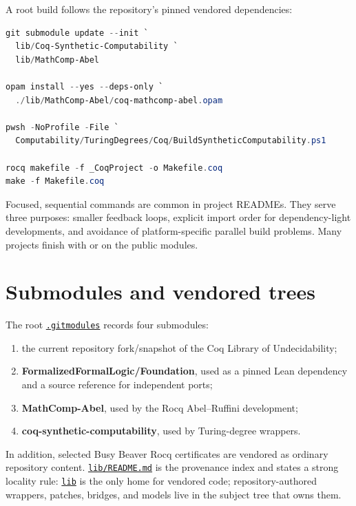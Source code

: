 \documentclass[
  10pt,
  a4paper,
  twoside,
  open=any,
  parskip=half,
  headings=big
]{scrreprt}
\newcommand{\CommitFull}{675d0a2ff0fc624fba199e006049016ba806f40a}
\newcommand{\RepoBlobBase}{https://github.com/VladimirReshetnikov/ProveIt/blob/\CommitFull/}
\newcommand{\RepoTreeBase}{https://github.com/VladimirReshetnikov/ProveIt/tree/\CommitFull/}
\newcommand{\RepoFile}[1]{%
  \href{\RepoBlobBase\detokenize{#1}}{\nolinkurl{#1}}}
\newcommand{\RepoDir}[1]{%
  \href{\RepoTreeBase\detokenize{#1}}{\nolinkurl{#1}}}
\newcommand{\code}[1]{\texttt{\detokenize{#1}}}
\newcommand{\project}[1]{\textsf{\bfseries #1}}
\begin{document}
A root build follows the repository's pinned vendored dependencies:

\begin{lstlisting}[language=PowerShell,caption={Repository-wide Rocq setup and build.}]
git submodule update --init `
  lib/Coq-Synthetic-Computability `
  lib/MathComp-Abel

opam install --yes --deps-only `
  ./lib/MathComp-Abel/coq-mathcomp-abel.opam

pwsh -NoProfile -File `
  Computability/TuringDegrees/Coq/BuildSyntheticComputability.ps1

rocq makefile -f _CoqProject -o Makefile.coq
make -f Makefile.coq
\end{lstlisting}

Focused, sequential \code{coqc} commands are common in project READMEs.  They
serve three purposes: smaller feedback loops, explicit import order for
dependency-light developments, and avoidance of platform-specific parallel
build problems.  Many projects finish with \code{coqchk} or \code{rocqchk} on
the public modules.

\section{Submodules and vendored trees}

The root \RepoFile{.gitmodules} records four submodules:

\begin{enumerate}
  \item the current repository fork/snapshot of the Coq Library of
        Undecidability;
  \item \project{FormalizedFormalLogic/Foundation}, used as a pinned Lean
        dependency and a source reference for independent ports;
  \item \project{MathComp-Abel}, used by the Rocq Abel--Ruffini development;
  \item \project{coq-synthetic-computability}, used by Turing-degree wrappers.
\end{enumerate}

In addition, selected Busy Beaver Rocq certificates are vendored as ordinary
repository content.  \RepoFile{lib/README.md} is the provenance index and states
a strong locality rule: \RepoDir{lib} is the only home for vendored code;
repository-authored wrappers, patches, bridges, and models live in the subject
tree that owns them.
\end{document}
